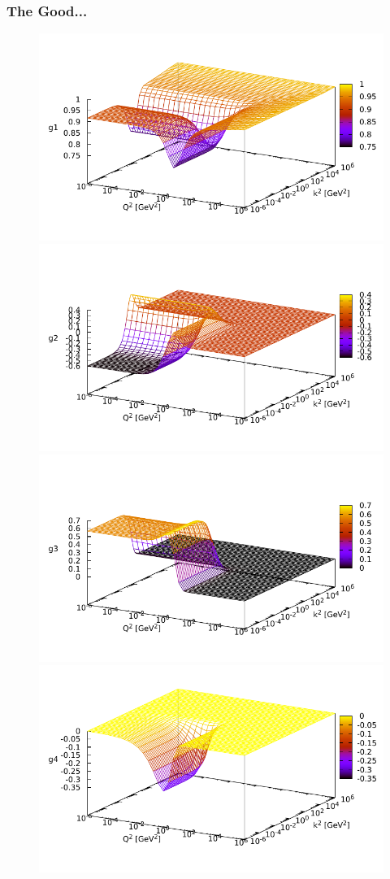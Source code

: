 \begin{frame}
    \frametitle{The Good...}
    \begin{figure}
        \centering
        \includegraphics[width=0.45\linewidth]{graphics/plots_bare/g1_dse_pv}
        \includegraphics[width=0.45\linewidth]{graphics/plots_bare/g2_dse_pv}
        \includegraphics[width=0.45\linewidth]{graphics/plots_bare/g3_dse_pv}
        \includegraphics[width=0.45\linewidth]{graphics/plots_bare/g4_dse_pv}
        \label{fig:gs}
    \end{figure}
\end{frame}


